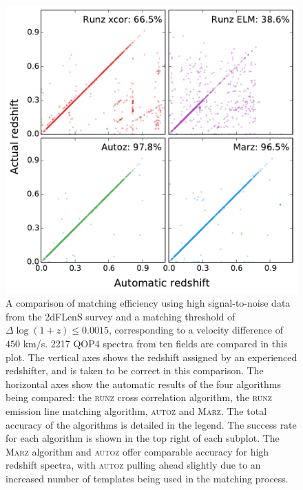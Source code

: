 \documentclass[iop]{emulateapj}
\newcommand{\runz}{\textsc{runz}}
\newcommand{\autoz}{\textsc{autoz}}
\newcommand{\marz}{\textsc{Marz}}
\begin{document}
\begin{figure}[t]
\centering
\includegraphics[width=\columnwidth]{2dfComp.pdf}
\caption{A comparison of matching efficiency using high signal-to-noise data from the 2dFLenS survey and a matching threshold of $\Delta \log(1+z) \leq 0.0015$, corresponding to a velocity difference of  $450$ km/s. 2217 QOP4 spectra from ten fields are compared in this plot. The vertical axes shows the redshift assigned by an experienced redshifter, and is taken to be correct in this comparison. The horizontal axes show the automatic results of the four algorithms being compared: the \runz{} cross correlation algorithm, the \runz{} emission line matching algorithm, \autoz{} and \marz{}. The total accuracy of the algorithms is detailed in the legend. The success rate for each algorithm is shown in the top right of each subplot. The \marz{} algorithm and \autoz{} offer comparable accuracy for high redshift spectra, with \autoz{} pulling ahead slightly due to an increased number of templates being used in the matching process.}
\label{fig:high}
\end{figure}
\end{document}
